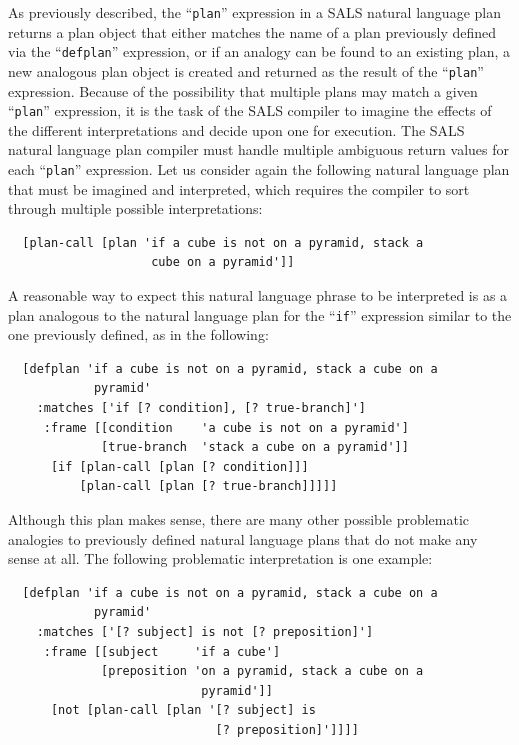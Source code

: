 As previously described, the ``{\tt{plan}}'' expression in a SALS
natural language plan returns a plan object that either matches the
name of a plan previously defined via the ``{\tt{defplan}}''
expression, or if an analogy can be found to an existing plan, a new
analogous plan object is created and returned as the result of the
``{\tt{plan}}'' expression.  Because of the possibility that multiple
plans may match a given ``{\tt{plan}}'' expression, it is the task of
the SALS compiler to imagine the effects of the different
interpretations and decide upon one for execution.  The SALS natural
language plan compiler must handle multiple ambiguous return values
for each ``{\tt{plan}}'' expression.  Let us consider again the
following natural language plan that must be imagined and interpreted,
which requires the compiler to sort through multiple possible
interpretations:
\begin{Verbatim}
  [plan-call [plan 'if a cube is not on a pyramid, stack a
                    cube on a pyramid']]
\end{Verbatim}
A reasonable way to expect this natural language phrase to be
interpreted is as a plan analogous to the natural language plan for
the ``{\tt{if}}'' expression similar to the one previously defined, as
in the following:
\begin{samepage}
\begin{Verbatim}
  [defplan 'if a cube is not on a pyramid, stack a cube on a
            pyramid'
    :matches ['if [? condition], [? true-branch]']
     :frame [[condition    'a cube is not on a pyramid']
             [true-branch  'stack a cube on a pyramid']]
      [if [plan-call [plan [? condition]]]
          [plan-call [plan [? true-branch]]]]]
\end{Verbatim}
\end{samepage}
Although this plan makes sense, there are many other possible
problematic analogies to previously defined natural language plans
that do not make any sense at all.  The following problematic
interpretation is one example:
\begin{samepage}
\begin{Verbatim}
  [defplan 'if a cube is not on a pyramid, stack a cube on a
            pyramid'
    :matches ['[? subject] is not [? preposition]']
     :frame [[subject     'if a cube']
             [preposition 'on a pyramid, stack a cube on a
                           pyramid']]
      [not [plan-call [plan '[? subject] is
                             [? preposition]']]]]
\end{Verbatim}
\end{samepage}

